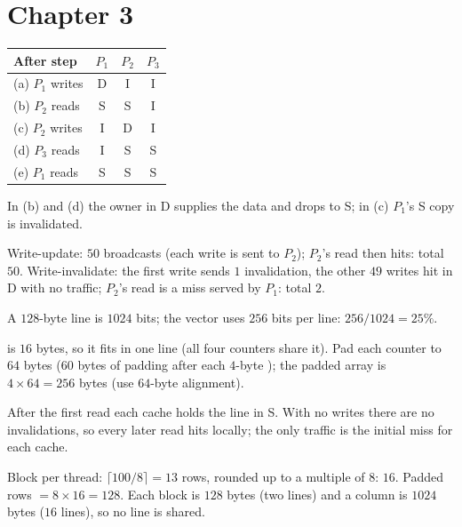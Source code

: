 \section*{Chapter 3}
\begin{description}[leftmargin=1.2cm,labelwidth=1cm,itemsep=3pt]
  \item[3.1]
  \begin{center}
  \small
  \begin{tabular}{@{}lccc@{}}
  \toprule
  After step & $P_1$ & $P_2$ & $P_3$\\
  \midrule
  (a) $P_1$ writes & D & I & I\\
  (b) $P_2$ reads & S & S & I\\
  (c) $P_2$ writes & I & D & I\\
  (d) $P_3$ reads & I & S & S\\
  (e) $P_1$ reads & S & S & S\\
  \bottomrule
  \end{tabular}
  \end{center}
  In (b) and (d) the owner in D supplies the data and drops to S; in (c) $P_1$'s S copy is invalidated.
  \item[3.2] Write-update: $50$ broadcasts (each write is sent to $P_2$); $P_2$'s read then hits: total $50$. Write-invalidate: the first write sends $1$ invalidation, the other $49$ writes hit in D with no traffic; $P_2$'s read is a miss served by $P_1$: total $2$.
  \item[3.3] A $128$-byte line is $1024$ bits; the vector uses $256$ bits per line: $256/1024=25\%$.
  \item[3.4]  is $16$ bytes, so it fits in one line (all four counters share it). Pad each counter to $64$ bytes ($60$ bytes of padding after each $4$-byte ); the padded array is $4\times64=256$ bytes (use $64$-byte alignment).
  \item[3.5] After the first read each cache holds the line in S. With no writes there are no invalidations, so every later read hits locally; the only traffic is the initial miss for each cache.
  \item[3.6] Block per thread: $\lceil100/8\rceil=13$ rows, rounded up to a multiple of $8$: $16$. Padded rows $=8\times16=128$. Each block is $128$ bytes (two lines) and a column is $1024$ bytes ($16$ lines), so no line is shared.
\end{description}

